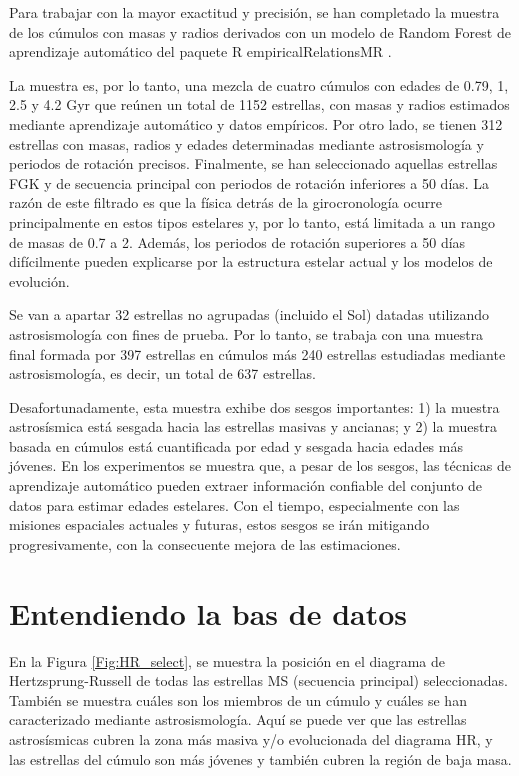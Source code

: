 Para trabajar con la mayor exactitud y precisión, se han completado la muestra de los cúmulos con masas y radios derivados con un modelo de Random Forest de aprendizaje automático del paquete R empiricalRelationsMR \cite{Moya18}.


La muestra es, por lo tanto, una mezcla de cuatro cúmulos con edades de 0.79, 1, 2.5 y 4.2 Gyr que reúnen un total de 1152 estrellas, con masas y radios estimados mediante aprendizaje automático y datos empíricos. Por otro lado, se tienen 312 estrellas con masas, radios y edades determinadas mediante astrosismología y periodos de rotación precisos. Finalmente, se han seleccionado aquellas estrellas FGK y de secuencia principal con periodos de rotación inferiores a 50 días. La razón de este filtrado es que la física detrás de la girocronología ocurre principalmente en estos tipos estelares y, por lo tanto, está limitada a un rango de masas de 0.7 a 2. Además, los periodos de rotación superiores a 50 días difícilmente pueden explicarse por la estructura estelar actual y los modelos de evolución.

Se van a apartar 32 estrellas no agrupadas (incluido el Sol) datadas utilizando astrosismología con fines de prueba. Por lo tanto, se trabaja con una muestra final formada por 397 estrellas en cúmulos más 240 estrellas estudiadas mediante astrosismología, es decir, un total de 637 estrellas.

Desafortunadamente, esta muestra exhibe dos sesgos importantes: 1) la muestra astrosísmica está sesgada hacia las estrellas masivas y ancianas; y 2) la muestra basada en cúmulos está cuantificada por edad y sesgada hacia edades más jóvenes. En los experimentos se muestra que, a pesar de los sesgos, las técnicas de aprendizaje automático pueden extraer información confiable del conjunto de datos para estimar edades estelares. Con el tiempo, especialmente con las misiones espaciales actuales y futuras, estos sesgos se irán mitigando progresivamente, con la consecuente mejora de las estimaciones.


\section{Entendiendo la bas de datos}

En la Figura \ref{Fig:HR_select}, se muestra la posición en el diagrama de Hertzsprung-Russell de todas las estrellas MS (secuencia principal) seleccionadas. También se muestra cuáles son los miembros de un cúmulo y cuáles se han caracterizado mediante astrosismología. Aquí se puede ver que las estrellas astrosísmicas cubren la zona más masiva y/o evolucionada del diagrama HR, y las estrellas del cúmulo son más jóvenes y también cubren la región de baja masa.

